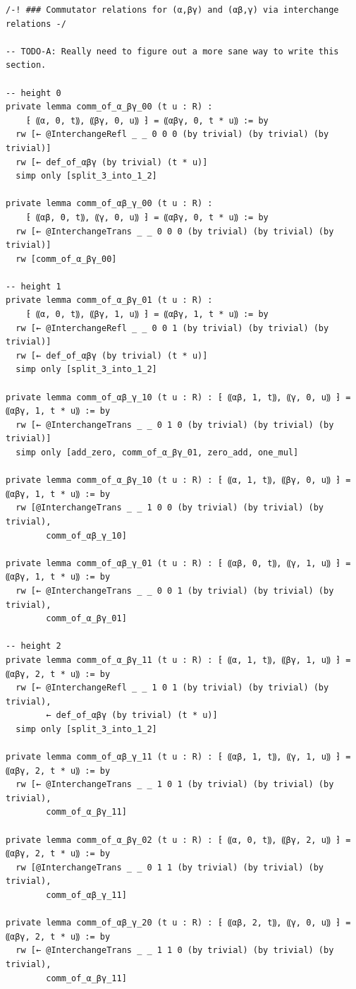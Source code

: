 \documentclass[10pt,a4paper]{article}
\begin{document}
\begin{Verbatim}
/-! ### Commutator relations for (α,βγ) and (αβ,γ) via interchange relations -/

-- TODO-A: Really need to figure out a more sane way to write this section.

-- height 0
private lemma comm_of_α_βγ_00 (t u : R) :
    ⁅ ⸨α, 0, t⸩, ⸨βγ, 0, u⸩ ⁆ = ⸨αβγ, 0, t * u⸩ := by
  rw [← @InterchangeRefl _ _ 0 0 0 (by trivial) (by trivial) (by trivial)]
  rw [← def_of_αβγ (by trivial) (t * u)]
  simp only [split_3_into_1_2]

private lemma comm_of_αβ_γ_00 (t u : R) :
    ⁅ ⸨αβ, 0, t⸩, ⸨γ, 0, u⸩ ⁆ = ⸨αβγ, 0, t * u⸩ := by
  rw [← @InterchangeTrans _ _ 0 0 0 (by trivial) (by trivial) (by trivial)]
  rw [comm_of_α_βγ_00]

-- height 1
private lemma comm_of_α_βγ_01 (t u : R) :
    ⁅ ⸨α, 0, t⸩, ⸨βγ, 1, u⸩ ⁆ = ⸨αβγ, 1, t * u⸩ := by
  rw [← @InterchangeRefl _ _ 0 0 1 (by trivial) (by trivial) (by trivial)]
  rw [← def_of_αβγ (by trivial) (t * u)]
  simp only [split_3_into_1_2]

private lemma comm_of_αβ_γ_10 (t u : R) : ⁅ ⸨αβ, 1, t⸩, ⸨γ, 0, u⸩ ⁆ = ⸨αβγ, 1, t * u⸩ := by
  rw [← @InterchangeTrans _ _ 0 1 0 (by trivial) (by trivial) (by trivial)]
  simp only [add_zero, comm_of_α_βγ_01, zero_add, one_mul]

private lemma comm_of_α_βγ_10 (t u : R) : ⁅ ⸨α, 1, t⸩, ⸨βγ, 0, u⸩ ⁆ = ⸨αβγ, 1, t * u⸩ := by
  rw [@InterchangeTrans _ _ 1 0 0 (by trivial) (by trivial) (by trivial),
        comm_of_αβ_γ_10]

private lemma comm_of_αβ_γ_01 (t u : R) : ⁅ ⸨αβ, 0, t⸩, ⸨γ, 1, u⸩ ⁆ = ⸨αβγ, 1, t * u⸩ := by
  rw [← @InterchangeTrans _ _ 0 0 1 (by trivial) (by trivial) (by trivial),
        comm_of_α_βγ_01]

-- height 2
private lemma comm_of_α_βγ_11 (t u : R) : ⁅ ⸨α, 1, t⸩, ⸨βγ, 1, u⸩ ⁆ = ⸨αβγ, 2, t * u⸩ := by
  rw [← @InterchangeRefl _ _ 1 0 1 (by trivial) (by trivial) (by trivial),
        ← def_of_αβγ (by trivial) (t * u)]
  simp only [split_3_into_1_2]

private lemma comm_of_αβ_γ_11 (t u : R) : ⁅ ⸨αβ, 1, t⸩, ⸨γ, 1, u⸩ ⁆ = ⸨αβγ, 2, t * u⸩ := by
  rw [← @InterchangeTrans _ _ 1 0 1 (by trivial) (by trivial) (by trivial),
        comm_of_α_βγ_11]

private lemma comm_of_α_βγ_02 (t u : R) : ⁅ ⸨α, 0, t⸩, ⸨βγ, 2, u⸩ ⁆ = ⸨αβγ, 2, t * u⸩ := by
  rw [@InterchangeTrans _ _ 0 1 1 (by trivial) (by trivial) (by trivial),
        comm_of_αβ_γ_11]

private lemma comm_of_αβ_γ_20 (t u : R) : ⁅ ⸨αβ, 2, t⸩, ⸨γ, 0, u⸩ ⁆ = ⸨αβγ, 2, t * u⸩ := by
  rw [← @InterchangeTrans _ _ 1 1 0 (by trivial) (by trivial) (by trivial),
        comm_of_α_βγ_11]


\end{Verbatim}
\end{document}
